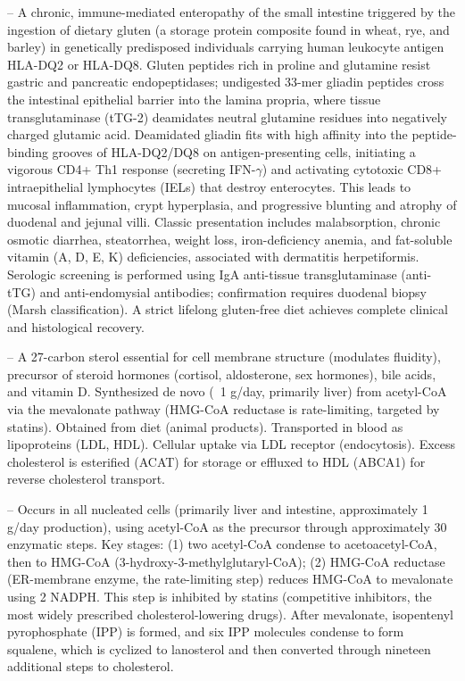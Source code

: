 -- A chronic, immune-mediated enteropathy of the small intestine triggered by the ingestion of dietary gluten (a storage protein composite found in wheat, rye, and barley) in genetically predisposed individuals carrying human leukocyte antigen HLA-DQ2 or HLA-DQ8. Gluten peptides rich in proline and glutamine resist gastric and pancreatic endopeptidases; undigested 33-mer gliadin peptides cross the intestinal epithelial barrier into the lamina propria, where tissue transglutaminase (tTG-2) deamidates neutral glutamine residues into negatively charged glutamic acid. Deamidated gliadin fits with high affinity into the peptide-binding grooves of HLA-DQ2/DQ8 on antigen-presenting cells, initiating a vigorous CD4+ Th1 response (secreting IFN-$\gamma$) and activating cytotoxic CD8+ intraepithelial lymphocytes (IELs) that destroy enterocytes. This leads to mucosal inflammation, crypt hyperplasia, and progressive blunting and atrophy of duodenal and jejunal villi. Classic presentation includes malabsorption, chronic osmotic diarrhea, steatorrhea, weight loss, iron-deficiency anemia, and fat-soluble vitamin (A, D, E, K) deficiencies, associated with dermatitis herpetiformis. Serologic screening is performed using IgA anti-tissue transglutaminase (anti-tTG) and anti-endomysial antibodies; confirmation requires duodenal biopsy (Marsh classification). A strict lifelong gluten-free diet achieves complete clinical and histological recovery.

-- A 27-carbon sterol essential for cell membrane structure (modulates fluidity), precursor of steroid hormones (cortisol, aldosterone, sex hormones), bile acids, and vitamin D. Synthesized de novo (~1 g/day, primarily liver) from acetyl-CoA via the mevalonate pathway (HMG-CoA reductase is rate-limiting, targeted by statins). Obtained from diet (animal products). Transported in blood as lipoproteins (LDL, HDL). Cellular uptake via LDL receptor (endocytosis). Excess cholesterol is esterified (ACAT) for storage or effluxed to HDL (ABCA1) for reverse cholesterol transport.

-- Occurs in all nucleated cells (primarily liver and intestine, approximately 1 g/day production), using acetyl-CoA as the precursor through approximately 30 enzymatic steps. Key stages: (1) two acetyl-CoA condense to acetoacetyl-CoA, then to HMG-CoA (3-hydroxy-3-methylglutaryl-CoA); (2) HMG-CoA reductase (ER-membrane enzyme, the rate-limiting step) reduces HMG-CoA to mevalonate using 2 NADPH. This step is inhibited by statins (competitive inhibitors, the most widely prescribed cholesterol-lowering drugs). After mevalonate, isopentenyl pyrophosphate (IPP) is formed, and six IPP molecules condense to form squalene, which is cyclized to lanosterol and then converted through nineteen additional steps to cholesterol.

